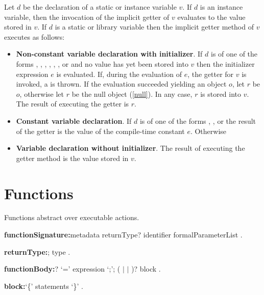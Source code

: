 \documentclass{article}
\begin{document}
\LMHash{}
Let $d$ be the declaration of a static or instance variable $v$.
If $d$ is an instance variable, then the invocation of the implicit getter of $v$ evaluates to the value stored in $v$.
If $d$ is a static or library variable then the implicit getter method of $v$ executes as follows:
\begin{itemize}
\item {\bf Non-constant variable declaration with initializer}.
If $d$ is of one of the forms , , , , , ,  or  and no value has yet been stored into $v$ then the initializer expression $e$ is evaluated.
If, during the evaluation of $e$, the getter for $v$ is invoked, a  is thrown.
If the evaluation succeeded yielding an object $o$, let $r$ be $o$, otherwise let $r$ be the null object (\ref{null}).
In any case, $r$ is stored into $v$.
The result of executing the getter is $r$.
\item {\bf Constant variable declaration}.
If $d$ is of one of the forms , ,  or  the result of the getter is the value of the compile-time constant $e$.
Otherwise
\item {\bf Variable declaration without initializer}.
The result of executing the getter method is the value stored in $v$.
\end{itemize}


\section{Functions}

\LMHash{}
Functions abstract over executable actions.

\begin{grammar}
{\bf functionSignature:}metadata returnType? identifier formalParameterList
  .

{\bf returnType:}\VOID{};
  type
  .

{\bf functionBody:}\ASYNC{}? `={\escapegrammar \gt}' expression `{\escapegrammar ;}';
  (\ASYNC{} $|$ \ASYNC* $|$ \SYNC*)? block
  .

{\bf block:}`\{' statements `\}'
  .
\end{grammar}
\end{document}
